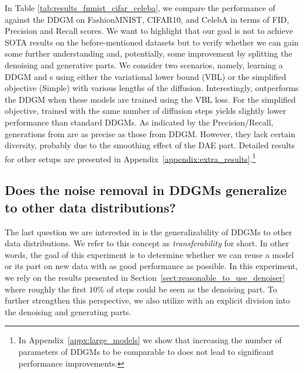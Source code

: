 In Table \ref{tab:results_fmnist_cifar_celeba}, we compare the performance of \ours{} against the DDGM on FashionMNIST, CIFAR10, and CelebA in terms of FID, Precision and Recall scores. We want to highlight that our goal is not to achieve SOTA results on the before-mentioned datasets but to verify whether we can gain some further understanding and, potentially, some improvement by splitting the denoising and generative parts. We consider two scenarios, namely, learning a DDGM and \ours{}s using either the variational lower bound (VBL) or the simplified objective (Simple) with various lengths of the diffusion. Interestingly, \ours{} outperforms the DDGM when these models are trained using the VBL loss. For the simplified objective, \ours{} trained with the same number of diffusion steps yields slightly lower performance than standard DDGMs. As indicated by the Precision/Recall, generations from \ours{} are as precise as those from DDGM. However, they lack certain diversity, probably due to the smoothing effect of the DAE part. Detailed results for other setups are presented in Appendix~\ref{appendix:extra_results}.\footnote{In Appendix~\ref{appx:large_models} we show that increasing the number of parameters of DDGMs to be comparable to \ours{} does not lead to significant performance improvements.}

\subsection{Does the noise removal in DDGMs generalize to other data distributions?}
The last question we are interested in is the generalizability of DDGMs to other data distributions. We refer to this concept as \textit{transferability} for short. In other words, the goal of this experiment is to determine whether we can reuse a model or its part on new data with as good performance as possible. In this experiment, we rely on the results presented in Section~\ref{sect:reasonable_to_use_denoiser} where roughly the first $10\%$ of steps could be seen as the denoising part. To further strengthen this perspective, we also utilize \ours{} with an explicit division into the denoising and generating parts.

